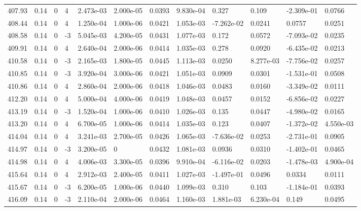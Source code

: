 \documentclass[preview]{standalone}
\begin{document}
{{{{{{{{{{{{{{{{{{{\begin{tabular}{L{1.2cm}C{1.2cm} C{0.3cm}C{0.5cm} C{1.4cm}C{1.4cm} C{1.4cm}C{1.4cm} C{1.6cm}C{1.6cm} C{1.6cm}C{1.6cm}}
  407.93  &  0.14  & 0     &  4 &  2.473e-03  & 2.000e-05  &  0.0393&   9.830e-04& 0.327 & 0.109   &  -2.309e-01 & 0.0766  \\ 
  408.44  &  0.14  & 0     &  4 &  1.250e-04  & 1.000e-06  &  0.0421&   1.053e-03& -7.262e-02 & 0.0241   &  0.0757 & 0.0251  \\ 
  408.58  &  0.14  & 0     & -3 &  5.045e-03  & 4.200e-05  &  0.0431&   1.077e-03& 0.172 & 0.0572   &  -7.093e-02 & 0.0235  \\ 
  409.91  &  0.14  & 0     &  4 &  2.640e-04  & 2.000e-06  &  0.0414&   1.035e-03& 0.278 & 0.0920   &  -6.435e-02 & 0.0213  \\ 
  410.58  &  0.14  & 0     & -3 &  2.165e-03  & 1.800e-05  &  0.0445&   1.113e-03& 0.0250 & 8.277e-03   &  -7.756e-02 & 0.0257  \\ 
  410.85  &  0.14  & 0     & -3 &  3.920e-04  & 3.000e-06  &  0.0421&   1.051e-03& 0.0909 & 0.0301   &  -1.531e-01 & 0.0508  \\ 
  410.86  &  0.14  & 0     &  4 &  2.860e-04  & 2.000e-06  &  0.0418&   1.046e-03& 0.0483 & 0.0160   &  -3.349e-02 & 0.0111  \\ 
  412.20  &  0.14  & 0     &  4 &  5.000e-04  & 4.000e-06  &  0.0419&   1.048e-03& 0.0457 & 0.0152   &  -6.856e-02 & 0.0227  \\ 
  413.19  &  0.14  & 0     & -3 &  1.520e-04  & 1.000e-06  &  0.0410&   1.026e-03& 0.135 & 0.0447   &  -4.980e-02 & 0.0165  \\ 
  413.20  &  0.14  & 0     &  4 &  6.700e-05  & 1.000e-06  &  0.0414&   1.035e-03& 0.123 & 0.0407   &  -1.372e-02 & 4.550e-03  \\ 
  414.04  &  0.14  & 0     &  4 &  3.241e-03  & 2.700e-05  &  0.0426&   1.065e-03& -7.636e-02 & 0.0253   &  -2.731e-01 & 0.0905  \\ 
  414.97  &  0.14  & 0     & -3 &  3.200e-05  & 0  &  0.0432&   1.081e-03& 0.0936 & 0.0310   &  -1.402e-01 & 0.0465  \\ 
  414.98  &  0.14  & 0     &  4 &  4.006e-03  & 3.300e-05  &  0.0396&   9.910e-04& -6.116e-02 & 0.0203   &  -1.478e-03 & 4.900e-04  \\ 
  415.64  &  0.14  & 0     &  4 &  2.912e-03  & 2.400e-05  &  0.0411&   1.027e-03& -1.497e-01 & 0.0496   &  0.0334 & 0.0111  \\ 
  415.67  &  0.14  & 0     & -3 &  6.200e-05  & 1.000e-06  &  0.0440&   1.099e-03& 0.310 & 0.103   &  -1.184e-01 & 0.0393  \\ 
  416.09  &  0.14  & 0     & -3 &  2.110e-04  & 2.000e-06  &  0.0464&   1.160e-03& 1.881e-03 & 6.230e-04   &  0.149 & 0.0495  \\ 

\end{tabular}}}}}}}}}}}}}}}}}}}}
\end{document}

